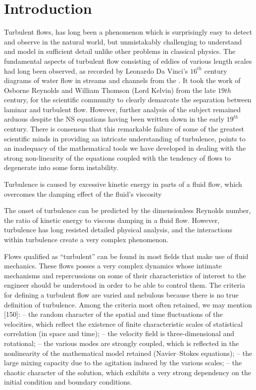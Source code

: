 \chapter{Introduction} %
\label{Chapter1}

Turbulent flows, has long been a phenomenon which is surprisingly easy to detect and observe in the natural world, but unmistakably challenging to understand and model in sufficient detail unlike other problems in classical physics.
The fundamental aspects of turbulent flow consisting of eddies of various length scales had long been observed, as recorded by Leonardo Da Vinci's $16^{th}$ century diagrams of water flow in streams and channels from the  \parencite{Colagrossi2021DaVinci}.
It took the work of Osborne Reynolds and William Thomson (Lord Kelvin) from the late $19th$ century, for the scientific community to clearly demarcate the separation between laminar and turbulent flow. However, further analysis of the subject remained arduous despite the NS equations having been written down in the early $19^{th}$ century. There is consensus that this remarkable failure of some of the greatest scientific minds in providing an intricate understanding of turbulence, points to an inadequacy of the mathematical tools we have developed in dealing with the strong non-linearity of the equations coupled with the tendency of flows to degenerate into some form instability.


Turbulence is caused by excessive kinetic energy in parts of a fluid flow, which overcomes the damping effect of the fluid's viscosity

The onset of turbulence can be predicted by the dimensionless Reynolds number, the ratio of kinetic energy to viscous damping in a fluid flow. However, turbulence has long resisted detailed physical analysis, and the interactions within turbulence create a very complex phenomenon.


Flows qualified as “turbulent” can be found in most fields that make use of
fluid mechanics. These flows posses a very complex dynamics whose intimate
mechanisms and repercussions on some of their characteristics of interest to
the engineer should be understood in order to be able to control them. The
criteria for defining a turbulent flow are varied and nebulous because there
is no true definition of turbulence. Among the criteria most often retained,
we may mention [150]: %
– the random character of the spatial and time fluctuations of the velocities, which reflect the existence of finite characteristic scales of statistical
correlation (in space and time);
– the velocity field is three-dimensional and rotational;
– the various modes are strongly coupled, which is reflected in the nonlinearity of the mathematical model retained (Navier–Stokes equations);
– the large mixing capacity due to the agitation induced by the various scales;
– the chaotic character of the solution, which exhibits a very strong dependency on the initial condition and boundary conditions.


